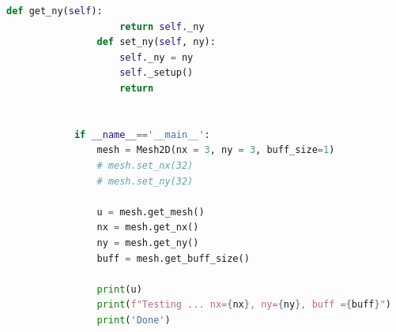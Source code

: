 \documentclass[12pt]{article}
\begin{document}
\begin{lstlisting}[language={Python}]
                def get_ny(self):
                    return self._ny
                def set_ny(self, ny):
                    self._ny = ny
                    self._setup()
                    return
            
            
            if __name__=='__main__':
                mesh = Mesh2D(nx = 3, ny = 3, buff_size=1)
                # mesh.set_nx(32)
                # mesh.set_ny(32)
                
                u = mesh.get_mesh()
                nx = mesh.get_nx()
                ny = mesh.get_ny()
                buff = mesh.get_buff_size()
            
                print(u)
                print(f"Testing ... nx={nx}, ny={ny}, buff ={buff}")
                print('Done')
        \end{lstlisting}
\end{document}
